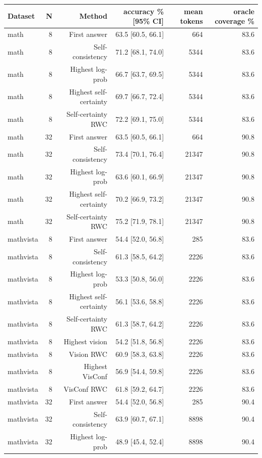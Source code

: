 \begin{table}[t]
\centering\small
\begin{tabular}{lrrrrr}
\toprule
Dataset & N & Method & accuracy \% [95\% CI] & mean tokens & oracle coverage \% \\
\midrule
math & 8 & First answer & 63.5 [60.5, 66.1] & 664 & 83.6 \\
math & 8 & Self-consistency & 71.2 [68.1, 74.0] & 5344 & 83.6 \\
math & 8 & Highest log-prob & 66.7 [63.7, 69.5] & 5344 & 83.6 \\
math & 8 & Highest self-certainty & 69.7 [66.7, 72.4] & 5344 & 83.6 \\
math & 8 & Self-certainty RWC & 72.2 [69.1, 75.0] & 5344 & 83.6 \\
math & 32 & First answer & 63.5 [60.5, 66.1] & 664 & 90.8 \\
math & 32 & Self-consistency & 73.4 [70.1, 76.4] & 21347 & 90.8 \\
math & 32 & Highest log-prob & 63.6 [60.1, 66.9] & 21347 & 90.8 \\
math & 32 & Highest self-certainty & 70.2 [66.9, 73.2] & 21347 & 90.8 \\
math & 32 & Self-certainty RWC & 75.2 [71.9, 78.1] & 21347 & 90.8 \\
mathvista & 8 & First answer & 54.4 [52.0, 56.8] & 285 & 83.6 \\
mathvista & 8 & Self-consistency & 61.3 [58.5, 64.2] & 2226 & 83.6 \\
mathvista & 8 & Highest log-prob & 53.3 [50.8, 56.0] & 2226 & 83.6 \\
mathvista & 8 & Highest self-certainty & 56.1 [53.6, 58.8] & 2226 & 83.6 \\
mathvista & 8 & Self-certainty RWC & 61.3 [58.7, 64.2] & 2226 & 83.6 \\
mathvista & 8 & Highest vision & 54.2 [51.8, 56.8] & 2226 & 83.6 \\
mathvista & 8 & Vision RWC & 60.9 [58.3, 63.8] & 2226 & 83.6 \\
mathvista & 8 & Highest VisConf & 56.9 [54.4, 59.8] & 2226 & 83.6 \\
mathvista & 8 & VisConf RWC & 61.8 [59.2, 64.7] & 2226 & 83.6 \\
mathvista & 32 & First answer & 54.4 [52.0, 56.8] & 285 & 90.4 \\
mathvista & 32 & Self-consistency & 63.9 [60.7, 67.1] & 8898 & 90.4 \\
mathvista & 32 & Highest log-prob & 48.9 [45.4, 52.4] & 8898 & 90.4 \\

\end{tabular}
\end{table}

